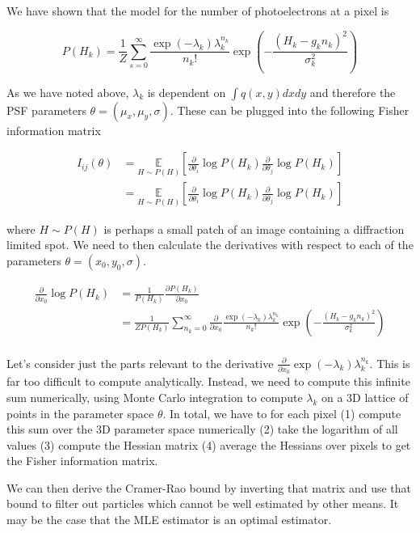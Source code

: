 \documentclass{article}
\begin{document}
We have shown that the model for the number of photoelectrons at a pixel is

\begin{equation*}
P(H_{k}) = \frac{1}{Z}\sum_{s=0}^{\infty}\frac{\exp\left({-\lambda_{k}}\right)\lambda_{k}^{n_{k}}}{n_{k}!}\exp\left(-\frac{(H_{k}-g_{k}n_{k})^{2}}{\sigma_{k}^{2}}\right)
\end{equation*}

As we have noted above, $\lambda_{k}$ is dependent on $\int q(x,y)dxdy$ and therefore the PSF parameters $\theta = (\mu_{x},\mu_{y},\sigma)$. These can be plugged into the following Fisher information matrix

\begin{align*}
I_{ij}(\theta) &= \underset{{H\sim P(H)}}{\mathbb{E}}\left[\frac{\partial}{\partial\theta_{i}} \log P(H_{k})\frac{\partial}{\partial\theta_{j}} \log P(H_{k})\right]\\
&= \underset{{H\sim P(H)}}{\mathbb{E}}\left[\frac{\partial}{\partial\theta_{i}} \log P(H_{k})\frac{\partial}{\partial\theta_{j}}\log P(H_{k})\right]
\end{align*}

where $H\sim P(H)$ is perhaps a small patch of an image containing a diffraction limited spot. We need to then calculate the derivatives with respect to each of the parameters $\theta = (x_{0},y_{0},\sigma)$. 

\begin{align*}
\frac{\partial}{\partial x_{0}}\log P(H_{k}) &= \frac{1}{P(H_{k})} \frac{\partial P(H_{k})}{\partial x_{0}}\\
&=  \frac{1}{ZP(H_{k})}\sum_{n_{k}=0}^{\infty}\frac{\partial}{\partial x_{0}}\frac{\exp\left({-\lambda_{k}}\right)\lambda_{k}^{n_{k}}}{n_{k}!}\exp\left(-\frac{(H_{k}-g_{k}n_{k})^{2}}{\sigma_{k}^{2}}\right)\\
\end{align*}

Let's consider just the parts relevant to the derivative $\frac{\partial}{\partial x_{0}}\exp\left(-\lambda_{k}\right)\lambda_{k}^{n_{k}}$. This is far too difficult to compute analytically. Instead, we need to compute this infinite sum numerically, using Monte Carlo integration to compute $\lambda_{k}$ on a 3D lattice of points in the parameter space $\theta$. In total, we have to for each pixel (1) compute this sum over the 3D parameter space numerically (2) take the logarithm of all values (3) compute the Hessian matrix (4) average the Hessians over pixels to get the Fisher information matrix. 

\vspace{0.2in}
We can then derive the Cramer-Rao bound by inverting that matrix and use that bound to filter out particles which cannot be well estimated by other means. It may be the case that the MLE estimator is an optimal estimator.
\end{document}
